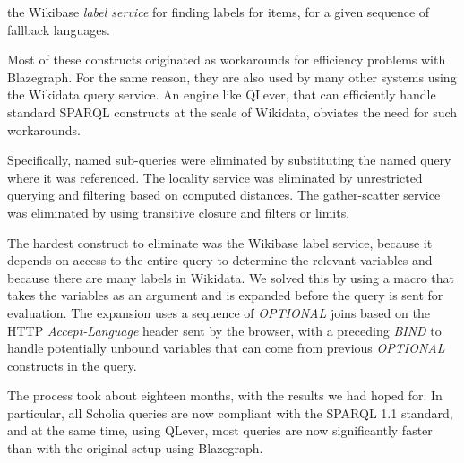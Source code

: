 \documentclass{ceurart}
\begin{document}
\Hitem 
the Wikibase \emph{label service} for finding labels for items, for a given sequence of fallback languages.

\smallskip\noindent
Most of these constructs originated as workarounds for efficiency problems with Blazegraph. For the same reason, they are also used by many other systems using the Wikidata query service. An engine like QLever, that can efficiently handle standard SPARQL constructs at the scale of Wikidata, obviates the need for such workarounds.

Specifically, named sub-queries were eliminated by substituting the named query where it was referenced.  The locality service was eliminated by unrestricted querying and filtering based on computed distances. The gather-scatter service was eliminated by using transitive closure and filters or limits.  

The hardest construct to eliminate was the Wikibase label service, because it depends on access to the entire query to determine the relevant variables and because there are many labels in Wikidata.
We solved this by using a macro that takes the variables as an argument and is expanded before the query is sent for evaluation.
The expansion uses a sequence of \emph{OPTIONAL} joins based on the HTTP \emph{Accept-Language} header sent by the browser,
with a preceding \emph{BIND} to handle potentially unbound variables that can come from previous \emph{OPTIONAL} constructs in the query.



The process took about eighteen months, with the results we had hoped for. In particular, all Scholia queries are now compliant with the SPARQL 1.1 standard, and at the same time, using QLever, most queries are now significantly faster than with the original setup using Blazegraph.
\end{document}
